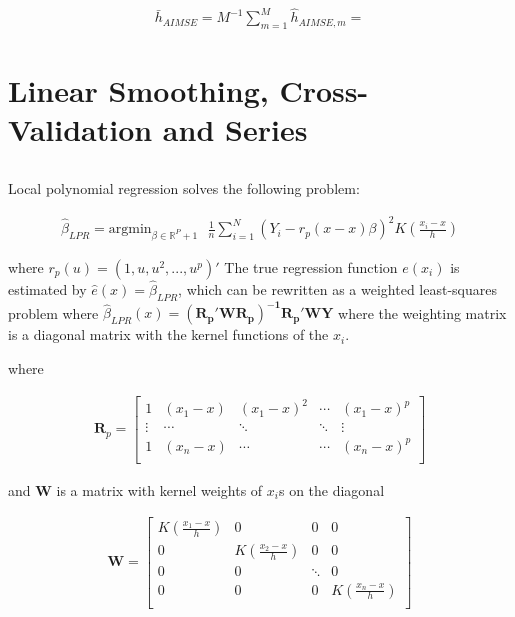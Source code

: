 \documentclass[12pt]{article}
\newcommand{\R}{\mathbb{R}}
\begin{document}
\begin{gather*}
\bar{h}_{AIMSE} = M^{-1} \sum_{m=1}^M  \hat{h}_{AIMSE,m} =
\end{gather*}










\newpage
\section{Linear Smoothing, Cross-Validation and Series}
\subsection{}

Local polynomial regression solves the following problem:

\begin{gather*}
\hat{\beta}_{LPR} =  \text{argmin}_{\beta \in \R^P+1} \text{    } \frac{1}{n}\sum\limits_{i=1}^N \left(Y_i - r_p(x-x)\beta  \right)^2 K(\frac{x_i - x}{h})
\end{gather*}

where $ r_p(u) =(1,u,u^2,...,u^p)' $ The true regression function $e(x_i)$ is estimated by $\hat{e}(x) = \hat{\beta}_{LPR}$, which can be rewritten as a weighted least-squares problem where $ \hat{\beta}_{LPR}(x) = \mathbf{ (R_p' W R_p)^{-1} R_p'WY } $  where the weighting matrix is a diagonal matrix with the kernel functions of the $ x_i $.

where

\begin{gather*}
\mathbf{R}_p = \begin{bmatrix}
1 & (x_1 - x) & (x_1 - x)^2 & \cdots & (x_1 - x)^p \\
\vdots & \cdots & \ddots & \ddots & \vdots \\
1 & (x_n - x) & \cdots & \cdots & (x_n - x)^p \\
\end{bmatrix}
\end{gather*}

and $\mathbf{W}$ is a matrix with kernel weights of $x_i$s on the diagonal

\begin{gather*}
\mathbf{W}  = \begin{bmatrix}
K(\frac{x_1 - x}{h}) & 0 & 0 & 0 \\
0 & K(\frac{x_2 - x}{h}) & 0 & 0 \\
0 & 0 & \ddots & 0 \\
0 & 0 & 0 & K(\frac{x_n - x}{h})  \\
\end{bmatrix}
\end{gather*}
\end{document}
